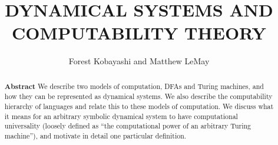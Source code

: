 \documentclass{fkpaper}
\title{DYNAMICAL SYSTEMS AND COMPUTABILITY THEORY}
\author{Forest Kobayashi and Matthew LeMay}
\affiliation{Department of Mathematics, Harvey Mudd College,
  Claremont, CA, 91711}
\begin{document}



\begin{abstract}
  \textbf{Abstract} We describe two models of computation, DFAs and
  Turing machines, and how they can be represented as dynamical
  systems. We also describe the computability hierarchy of languages
  and relate this to these models of computation. We discuss what it
  means for an arbitrary symbolic dynamical system to have
  computational universality (loosely defined as ``the computational
  power of an arbitrary Turing machine''), and motivate in detail one
  particular definition.
\end{abstract}


\end{document}
